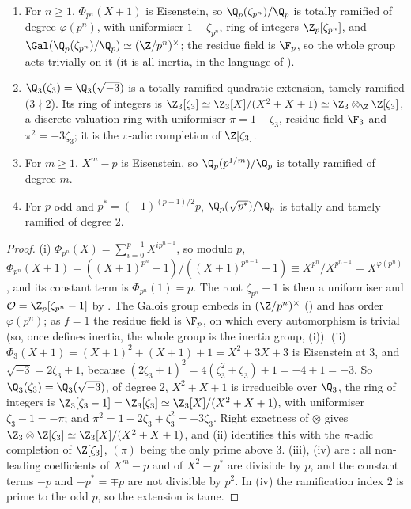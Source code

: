 \begin{proposition}\label{prop:local:z3zeta3}
\begin{enumerate}[label=(\roman*)]
\item For $n\ge1$, $\Phi_{p^n}(X+1)$ is Eisenstein, so $\Q_p(\zeta_{p^n})/\Q_p$ is totally ramified of degree $\varphi(p^n)$, with uniformiser
$1-\zeta_{p^n}$, ring of integers $\Z_p[\zeta_{p^n}]$, and $\Gal(\Q_p(\zeta_{p^n})/\Q_p)\simeq(\Z/p^n)^\times$; the residue field is $\F_p$, so the whole group acts
trivially on it (it is all inertia, in the language of ).
\item $\Q_3(\zeta_3)=\Q_3(\sqrt{-3})$ is a totally ramified quadratic extension, tamely ramified ($3\nmid2$). Its ring of integers is
$\Z_3[\zeta_3]\simeq\Z_3[X]/(X^2+X+1)\simeq\Z_3\otimes_\Z\Z[\zeta_3]$, a discrete valuation ring with uniformiser $\pi=1-\zeta_3$, residue field $\F_3$
and $\pi^2=-3\zeta_3$; it is the $\pi$-adic completion of $\Z[\zeta_3]$.
\item For $m\ge1$, $X^m-p$ is Eisenstein, so $\Q_p(p^{1/m})/\Q_p$ is totally ramified of degree $m$.
\item For $p$ odd and $p^*=(-1)^{(p-1)/2}p$, $\Q_p(\sqrt{p^*})/\Q_p$ is totally and tamely ramified of degree $2$.
\end{enumerate}
\end{proposition}

\begin{proof}
(i) $\Phi_{p^n}(X)=\sum_{i=0}^{p-1}X^{ip^{n-1}}$, so modulo $p$, $\Phi_{p^n}(X+1)=((X+1)^{p^n}-1)/((X+1)^{p^{n-1}}-1)\equiv X^{p^n}/X^{p^{n-1}}=X^{\varphi(p^n)}$, and
its constant term is $\Phi_{p^n}(1)=p$. The root $\zeta_{p^n}-1$ is then a uniformiser and $\mathcal O=\Z_p[\zeta_{p^n}-1]$ by . The
Galois group embeds in $(\Z/p^n)^\times$ () and has order $\varphi(p^n)$; as $f=1$ the residue field is $\F_p$, on which every automorphism is trivial (so, once  defines inertia,
the whole group is the inertia group, (i)).
(ii) $\Phi_3(X+1)=(X+1)^2+(X+1)+1=X^2+3X+3$ is Eisenstein at $3$, and $\sqrt{-3}=2\zeta_3+1$, because
$(2\zeta_3+1)^2=4(\zeta_3^2+\zeta_3)+1=-4+1=-3$. So $\Q_3(\zeta_3)=\Q_3(\sqrt{-3})$, of degree $2$, $X^2+X+1$ is irreducible
over $\Q_3$, the ring of integers is $\Z_3[\zeta_3-1]=\Z_3[\zeta_3]\simeq\Z_3[X]/(X^2+X+1)$, with uniformiser $\zeta_3-1=-\pi$; and
$\pi^2=1-2\zeta_3+\zeta_3^2=-3\zeta_3$. Right exactness of $\otimes$ gives $\Z_3\otimes\Z[\zeta_3]\simeq\Z_3[X]/(X^2+X+1)$, and
(ii) identifies this with the $\pi$-adic completion of $\Z[\zeta_3]$, $(\pi)$ being the only prime above $3$.
(iii), (iv) are : all non-leading coefficients of $X^m-p$ and of $X^2-p^*$ are divisible by $p$, and the constant
terms $-p$ and $-p^*=\mp p$ are not divisible by $p^2$. In (iv) the ramification index $2$ is prime to the odd $p$, so the extension is tame.
\end{proof}

